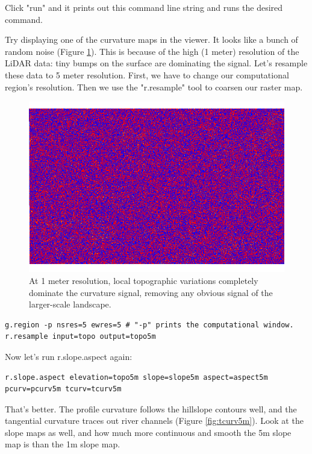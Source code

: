 \documentclass{book}
\begin{document}
Click "run" and it prints out this command line string and runs the desired command.

Try displaying one of the curvature maps in the viewer. It looks like a bunch of random noise (Figure \ref{fig:tcurv1m}). This is because of the high (1 meter) resolution of the LiDAR data: tiny bumps on the surface are dominating the signal. Let's resample these data to 5 meter resolution. First, we have to change our computational region's resolution. Then we use the "r.resample" tool to coarsen our raster map.

\begin{figure}[h]
 \begin{center}
 \includegraphics[width=.9\linewidth]{figures/ubuntu/tcurv1m.png}
 \caption{At 1 meter resolution, local topographic variations completely dominate the curvature signal, removing any obvious signal of the larger-scale landscape.}
 \label{fig:tcurv1m}
 \end{center}
\end{figure}


\begin{lstlisting}
g.region -p nsres=5 ewres=5 # "-p" prints the computational window.
r.resample input=topo output=topo5m
\end{lstlisting}

Now let's run r.slope.aspect again:

\begin{lstlisting}
r.slope.aspect elevation=topo5m slope=slope5m aspect=aspect5m pcurv=pcurv5m tcurv=tcurv5m
\end{lstlisting}

That's better. The profile curvature follows the hillslope contours well, and the tangential curvature traces out river channels (Figure \ref{fig:tcurv5m}). Look at the slope maps as well, and how much more continuous and smooth the 5m slope map is than the 1m slope map.
\end{document}
